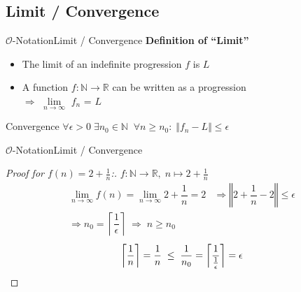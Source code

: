 
\subsection{Limit / Convergence}

\begin{frame}{$\mathcal{O}$-Notation}{Limit / Convergence}
  \textbf{Definition of \enquote{Limit}}
  \begin{itemize}
    \item
      The limit of an indefinite progression $f$ is $L$
    \item
      A function $f\!: \mathbb{N} \rightarrow \mathbb{R}$ can be written as a
      progression\\
      $\Rightarrow$ $\lim\limits_{n \rightarrow \infty}$ $f_n$ = $L$
  \end{itemize}
  \begin{block}{Convergence}
    \begin{math}
      \forall \epsilon > 0 \; \exists n_0 \in \mathbb{N} \;\;
      \forall n \geq n_0 \! : \; \Vert f_n - L \Vert \leq \epsilon
    \end{math}
  \end{block}
\end{frame}


\begin{frame}{$\mathcal{O}$-Notation}{Limit / Convergence}
  \begin{proof}[Proof for $f(n) = 2 + \frac{1}{n}$:]
    $f\!: \mathbb{N} \to \mathbb{R}, \; n \mapsto 2 + \frac{1}{n}$
    \begin{eqnarray*}
      \lim_{n \to \infty} f(n)
        = \lim_{n \to \infty} 2 + \dfrac{1}{n}
        = 2
      & \Rightarrow \left\Vert 2 + \dfrac{1}{n} - 2 \right\Vert \leq \epsilon\\
      \Rightarrow n_0 = \left\lceil \dfrac{1}{\epsilon} \right\rceil
      \; \Rightarrow \; n \geq n_0
    \end{eqnarray*}
    \begin{eqnarray*}
      \left\lceil
        \frac{1}{n} \vphantom{\dfrac{1}{\frac{1}{\epsilon}}}
      \right\rceil
        = \dfrac{1}{n}
      \; \leq \;
      \dfrac{1}{n_0} = \left\lceil \dfrac{1}{\frac{1}{\epsilon}} \right\rceil
        = \epsilon
      \qedhere
    \end{eqnarray*}
  \end{proof}
\end{frame}

